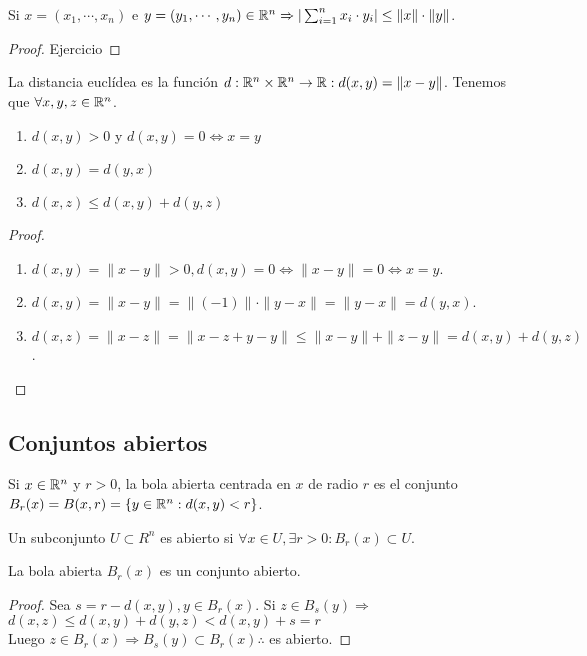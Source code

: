 \begin{prop}
  Si $x = (x_1, \cdots, x_n)$ e $y = (y_1, \cdots, y_n) \in \mathbb{R}^n \Rightarrow | \sum_{i = 1}^n x_i \cdot y_i | \leq \|x\| \cdot \|y\|$.
  \begin{proof}
    Ejercicio
  \end{proof}
\end{prop}

\begin{definition}
  La distancia euclídea es la función $d: \mathbb{R}^n \times \mathbb{R}^n \to \mathbb{R} : d(x, y) = \|x-y\|$.
  Tenemos que $\forall x,y,z \in \mathbb{R}^n$.
  \begin{enumerate}
    \item $d(x, y) > 0$ y $d(x, y) = 0 \iff x=y$
    \item $d(x, y) = d(y, x)$
    \item $d(x, z) \leq d(x, y) + d(y, z)$
  \end{enumerate}
  \begin{proof}
    \begin{enumerate}
      \item $d(x, y) = \|x-y\| > 0, d(x, y) = 0 \iff \|x-y\| = 0 \iff x = y$.
      \item $d(x, y) = \|x-y\| = \|(-1)\| \cdot \|y-x\| = \|y-x\| = d(y, x)$.
      \item $d(x, z) = \|x-z\| = \|x-z+y-y\| \leq \|x-y\| + \|z-y\| = d(x, y) + d(y, z)$.
    \end{enumerate}
  \end{proof}
\end{definition}

\subsection{Conjuntos abiertos}
\begin{definition}
  Si $x \in \mathbb{R}^n$ y $r > 0$, la bola abierta centrada en $x$ de radio $r$ es el conjunto $B_r(x) = B(x,r) = \{ y \in \mathbb{R}^n : d(x, y) < r \}$.
\end{definition}

\begin{definition}
  Un subconjunto $U \subset R^n$ es abierto si $\forall x \in U, \exists r > 0 : B_r(x) \subset U$.
\end{definition}

\begin{lemma}
  La bola abierta $B_r(x)$ es un conjunto abierto.
  \begin{proof}
    Sea $s = r - d(x, y), y \in B_r(x)$. Si $z \in B_s(y) \Rightarrow$ \\
    $d(x, z) \leq d(x, y) + d(y, z) < d(x, y) + s = r$ \\
    Luego $z \in B_r(x) \Rightarrow B_s(y) \subset B_r(x) \therefore$ es abierto.
  \end{proof}
\end{lemma}

